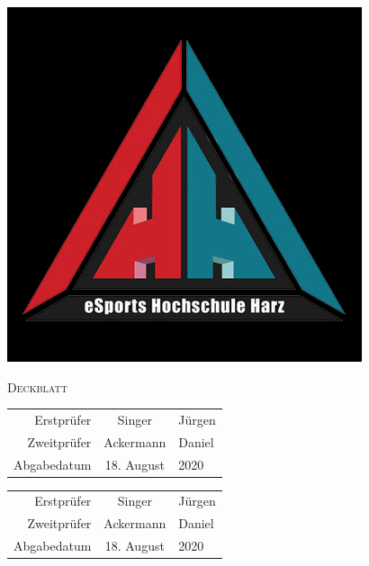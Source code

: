

    \begin{center}

        \includegraphics[width=0.5\paperwidth]{graphics/logo black.jpg}
        \vspace{20mm}

        \Huge{\textsc{Deckblatt}}
        \normalsize
    
        \vspace{20mm}
    
        \begin{tabular}{r c l}
            Erstprüfer & Singer & Jürgen \\
            Zweitprüfer & Ackermann & Daniel \\
            Abgabedatum & 18. August & 2020 \\
        \end{tabular}
    
        \vfill
        \begin{tabular}{r c l}
            Erstprüfer & Singer & Jürgen \\
            Zweitprüfer & Ackermann & Daniel \\
            Abgabedatum & 18. August & 2020 \\
        \end{tabular}
    
    
        
    
    \end{center}